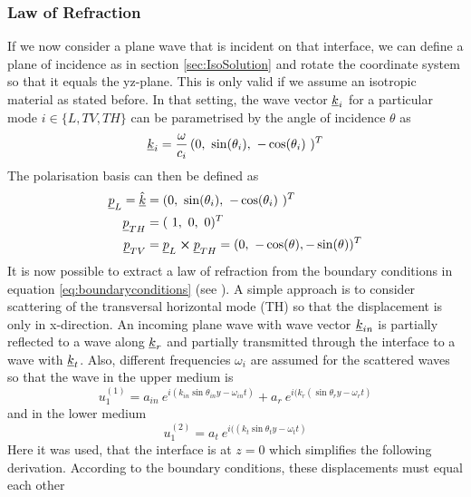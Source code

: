 \subsubsection{Law of Refraction}
If we now consider a plane wave that is incident on that interface, we can
define a plane of incidence as in section \ref{sec:IsoSolution} and rotate the
coordinate system so that it equals the yz-plane. This is only valid if we
assume an isotropic material as stated before.
In that setting, the wave vector $\underline{k}_i$ for a particular mode $i \in
    \{L,TV,TH\}$ can be parametrised by the angle of incidence $\theta$ as
\begin{equation}
    \uline{k}_i = \frac{\omega}{c_i}\, ( 0,\ \sin(\theta_i),\ -\cos(\theta_i)\
    )^T
\end{equation}
The polarisation basis can then be defined as
\begin{align}
    \uline{p}_L = \uline{\hat{k}} & = ( 0,\ \sin(\theta_i),\ -\cos(\theta_i)\
    )^T
    \\
    \uline{p}_{TH}                & = (\ 1,\ 0,\ 0)^T
    \\
    \uline{p}_{TV}                & = \uline{p}_L \cross \uline{p}_{TH}
    = ( 0,\ -\cos(\theta), -\sin(\theta))^T
\end{align}
It is now possible to extract a law of refraction from the boundary conditions
in equation \ref{eq:boundaryconditions} (see \cite[168ff]{achenbach1973wave}).
A simple approach is to consider
scattering of the transversal horizontal mode (TH) so that the displacement is
only in x-direction. An incoming plane wave with
wave vector $\underline{k}_{in}$ is partially reflected to a wave along
$\underline{k}_r$ and partially transmitted through the interface to a wave with
$\underline{k}_t$. Also, different frequencies $\omega_i$ are assumed for the
scattered waves so that the wave in the upper medium is
\begin{equation}
    u_1^{(1)} = a_{in}\
    e^{i( k_{in}\sin\theta_{in} y-\omega_{in} t)}
    + a_r\ e^{i( k_{r}(\sin\theta_{r} y -\omega_{r} t)}
\end{equation}
and in the lower medium
\begin{equation}
    u_1^{(2)} = a_{t}\
    e^{i(( k_{t}\sin\theta_{t} y -\omega_{t} t)}
\end{equation}
Here it was used, that the interface is at $z=0$ which simplifies the following
derivation.
According to the boundary conditions, these displacements must equal each other
